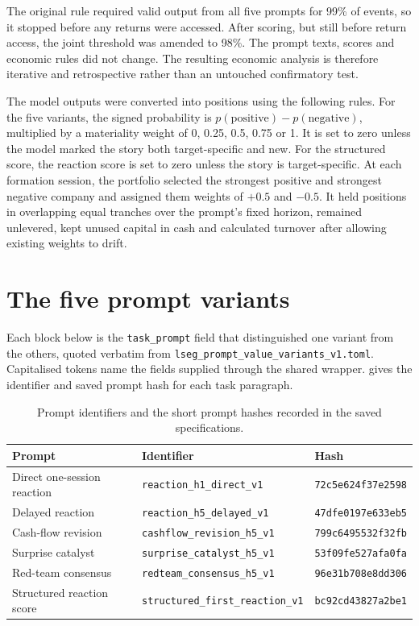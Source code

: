 The original rule required valid output from all five prompts for 99\% of events,
so it stopped before any returns were accessed. After scoring, but still before
return access, the joint threshold was amended to 98\%. The prompt texts, scores
and economic rules did not change. The resulting economic analysis is therefore
iterative and retrospective rather than an untouched confirmatory test.

The model outputs were converted into positions using the following rules. For
the five variants, the signed
probability is $p(\mathrm{positive})-p(\mathrm{negative})$, multiplied by a
materiality weight of 0, 0.25, 0.5, 0.75 or 1. It is set to zero unless the model
marked the story both target-specific and new. For the structured score, the
reaction score is set to zero unless the story is target-specific.
At each formation session, the portfolio selected the strongest positive and
strongest negative company and assigned them weights of $+0.5$ and $-0.5$. It
held positions in overlapping equal tranches over the prompt's fixed horizon,
remained unlevered, kept unused capital in cash and calculated turnover after
allowing existing weights to drift.

\section{The five prompt variants}
\label{sec:prompt-variants}

Each block below is the \texttt{task\_prompt} field that distinguished one
variant from the others, quoted verbatim from
\texttt{lseg\_prompt\_value\_variants\_v1.toml}. Capitalised tokens name the
fields supplied through the shared wrapper.  gives
the identifier and saved prompt hash for each task paragraph.

\begin{table}[htbp]
  \centering
  \caption[Prompt identifiers and hashes]{Prompt identifiers and the short prompt hashes recorded in the saved specifications.}
  \label{tab:prompt-identifiers}
  \small
  \begin{tabular}{@{}l l l@{}}
    \toprule
    Prompt & Identifier & Hash \\
    \midrule
    Direct one-session reaction & \texttt{reaction\_h1\_direct\_v1} & \texttt{72c5e624f37e2598} \\
    Delayed reaction & \texttt{reaction\_h5\_delayed\_v1} & \texttt{47dfe0197e633eb5} \\
    Cash-flow revision & \texttt{cashflow\_revision\_h5\_v1} & \texttt{799c6495532f32fb} \\
    Surprise catalyst & \texttt{surprise\_catalyst\_h5\_v1} & \texttt{53f09fe527afa0fa} \\
    Red-team consensus & \texttt{redteam\_consensus\_h5\_v1} & \texttt{96e31b708e8dd306} \\
    Structured reaction score & \texttt{structured\_first\_reaction\_v1} & \texttt{bc92cd43827a2be1} \\
    \bottomrule
  \end{tabular}
\end{table}

